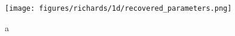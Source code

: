 \begin{figure}[ht]
\begin{center}
\texttt{[image: figures/richards/1d/recovered\_parameters.png]}
\end{center}
\caption{
a
}
\label{fig:richards-1d-recovered_parameters}
\end{figure}
